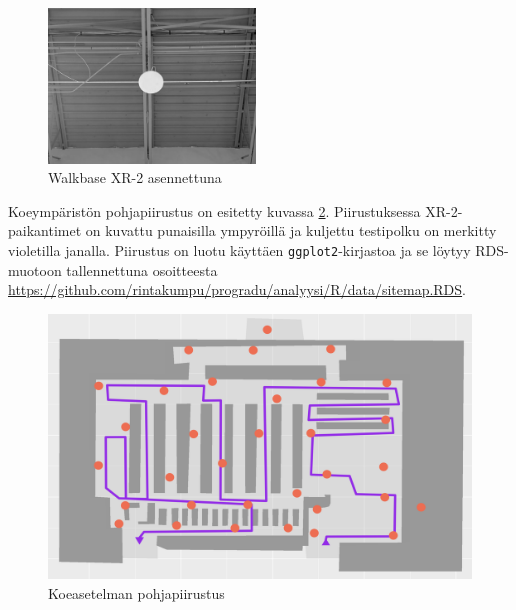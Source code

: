 \documentclass[
  12pt,
  a4paper, twoside]{book}
\begin{document}
\begin{figure}[H]
\centering
\includegraphics[width=5.5cm]{xr_2_installed}
\caption{Walkbase XR-2 asennettuna}
\label{fig:xr2_installed}
\end{figure}

Koeympäristön pohjapiirustus on esitetty kuvassa \ref{fig:testipolku}. Piirustuksessa XR-2-paikantimet on kuvattu punaisilla ympyröillä ja kuljettu testipolku on merkitty violetilla janalla. Piirustus on luotu käyttäen \texttt{ggplot2}-kirjastoa ja se löytyy RDS-muotoon tallennettuna osoitteesta \newline \url{https://github.com/rintakumpu/progradu/analyysi/R/data/sitemap.RDS}.

\begin{figure}[H]
\centering
\includegraphics[width=15cm]{testipolku_numeroimaton}
\caption{Koeasetelman pohjapiirustus}
\label{fig:testipolku}
\end{figure}
\end{document}

